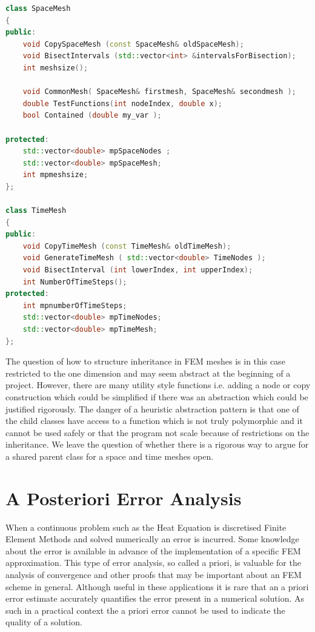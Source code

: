 \documentclass{uonmathreport}
\theoremstyle{definition}
\theoremstyle{problem}
\theoremstyle{theorem}
\begin{document}
{\begin{lstlisting}[language=C++]
class SpaceMesh
{
public:
    void CopySpaceMesh (const SpaceMesh& oldSpaceMesh);
    void BisectIntervals (std::vector<int> &intervalsForBisection);
    int meshsize();

    void CommonMesh( SpaceMesh& firstmesh, SpaceMesh& secondmesh );
    double TestFunctions(int nodeIndex, double x);
    bool Contained (double my_var );

protected:
    std::vector<double> mpSpaceNodes ;
    std::vector<double> mpSpaceMesh;
    int mpmeshsize;
};

class TimeMesh
{
public:
    void CopyTimeMesh (const TimeMesh& oldTimeMesh);
    void GenerateTimeMesh ( std::vector<double> TimeNodes );
    void BisectInterval (int lowerIndex, int upperIndex);
    int NumberOfTimeSteps();
protected:
    int mpnumberOfTimeSteps;
    std::vector<double> mpTimeNodes;
    std::vector<double> mpTimeMesh;
};


\end{lstlisting}

The question of how to structure inheritance in FEM meshes is in this case restricted to the one dimension and may seem abstract at the beginning of a project. However, there are many utility style functions i.e. adding a node or copy construction which could be simplified if there was an abstraction which could be justified rigorously. The danger of a heuristic abstraction pattern is that one of the child classes have access to a function which is not truly polymorphic and it cannot be used safely or that the program not scale because of restrictions on the inheritance. We leave the question of whether there is a rigorous way to argue for a shared parent class for a space and time meshes open. 

\newpage

\section{A Posteriori Error Analysis} \label{sec:Errors}

When a continuous problem such as the Heat Equation is discretised Finite Element Methods and solved numerically an error is incurred. Some knowledge about the error is available in advance of the implementation of a specific FEM approximation. This type of error analysis, so called a priori, is valuable for the analysis of convergence and other proofs that may be important about an FEM scheme in general. Although useful in these applications it is rare that an a priori error estimate accurately quantifies the error present in a numerical solution. As such in a practical context the a priori error cannot be used to indicate the quality of a solution. 

}
\end{document}
